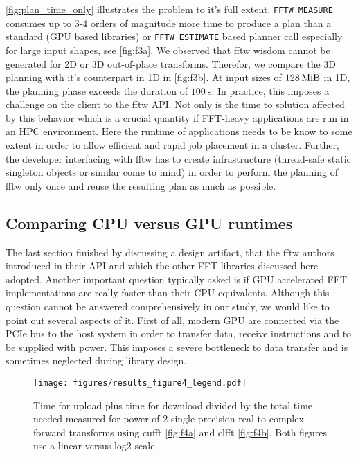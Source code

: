 \cref{fig:plan_time_only} illustrates the problem to it's full extent. \texttt{FFTW\_MEASURE} consumes up to 3-4 orders of magnitude more time to produce a plan than a standard (GPU based libraries) or \texttt{FFTW\_ESTIMATE} based planner call especially for large input shapes, see \cref{fig:f3a}. We observed that fftw wisdom cannot be generated for 2D or 3D out-of-place transforms. Therefor, we compare the 3D planning with it's counterpart in 1D in \cref{fig:f3b}. At input sizes of $\SI{128}{\mebi\byte}$ in 1D, the planning phase exceeds the duration of $\SI{100}{\s}$. In practice, this imposes a challenge on the client to the fftw API. Not only is the time to solution affected by this behavior which is a crucial quantity if FFT-heavy applications are run in an HPC environment. Here the runtime of applications needs to be know to some extent in order to allow efficient and rapid job placement in a cluster. Further, the developer interfacing with fftw has to create infrastructure (thread-safe static singleton objects or similar come to mind) in order to perform the planning of fftw only once and reuse the resulting plan as much as possible.

\subsection{Comparing CPU versus GPU runtimes}
\label{ssec:cpu_vs_gpu}

The last section finished by discussing a design artifact, that the fftw authors introduced in their API and which the other FFT libraries discussed here adopted. Another important question typically asked is if GPU accelerated FFT implementations are really faster than their CPU equivalents. Although this question cannot be answered comprehensively in our study, we would like to point out several aspects of it. First of all, modern GPU are connected via the PCIe bus to the host system in order to transfer data, receive instructions and to be supplied with power. This imposes a severe bottleneck to data transfer and is sometimes neglected during library design. 

\begin{figure}[!tbp]
  \centering
  \texttt{[image: figures/results\_figure4\_legend.pdf]}
  \hfill
  \caption{Time for upload plus time for download divided by the total time needed measured for power-of-2 single-precision real-to-complex forward transforms using cufft \cref{fig:f4a} and clfft \cref{fig:f4b}. Both figures use a linear-versus-log2 scale.}
  \label{fig:device_transfer}
\end{figure}

